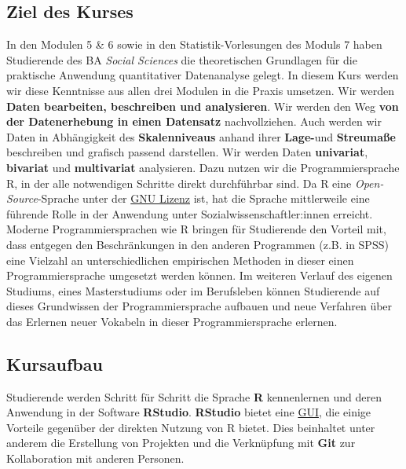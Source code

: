 \documentclass[11pt,a4paper]{article}
\begin{document}
\subsection*{Ziel des Kurses}
In den Modulen 5 \& 6 sowie in den Statistik-Vorlesungen des Moduls 7 haben Studierende des BA \textit{Social Sciences} die theoretischen Grundlagen für die praktische Anwendung quantitativer Datenanalyse gelegt. In diesem Kurs werden wir diese Kenntnisse aus allen drei Modulen in die Praxis umsetzen. Wir werden \textbf{Daten bearbeiten, beschreiben und analysieren}. Wir werden den Weg \textbf{von der Datenerhebung in einen Datensatz} nachvollziehen. Auch werden wir Daten in Abhängigkeit des \textbf{Skalenniveaus} anhand ihrer \textbf{Lage-}und \textbf{Streumaße} beschreiben und grafisch passend darstellen. Wir werden Daten \textbf{univariat}, \textbf{bivariat} und \textbf{multivariat} analysieren. Dazu nutzen wir die Programmiersprache R, in der alle notwendigen Schritte direkt durchführbar sind. Da R eine \textit{Open-Source}-Sprache unter der \href{https://de.wikipedia.org/wiki/GNU-Lizenz}{GNU Lizenz} ist, hat die Sprache mittlerweile eine führende Rolle in der Anwendung unter Sozialwissenschaftler:innen erreicht. Moderne Programmiersprachen wie R bringen für Studierende den Vorteil mit, dass entgegen den Beschränkungen in den anderen Programmen (z.B. in SPSS) eine Vielzahl an unterschiedlichen empirischen Methoden in dieser einen Programmiersprache umgesetzt werden können. Im weiteren Verlauf des eigenen Studiums, eines Masterstudiums oder im Berufsleben können Studierende auf dieses Grundwissen der Programmiersprache aufbauen und neue Verfahren über das Erlernen neuer Vokabeln in dieser Programmiersprache erlernen. 

\subsection*{Kursaufbau}
Studierende werden Schritt für Schritt die Sprache \textbf{R} kennenlernen und deren Anwendung in der Software \textbf{RStudio}. \textbf{RStudio} bietet eine \href{https://en.wikipedia.org/wiki/Graphical_user_interface}{GUI}, die einige Vorteile gegenüber der direkten Nutzung von R bietet. Dies beinhaltet unter anderem die Erstellung von Projekten und die Verknüpfung mit \textbf{Git} zur Kollaboration mit anderen Personen. 
\end{document}
